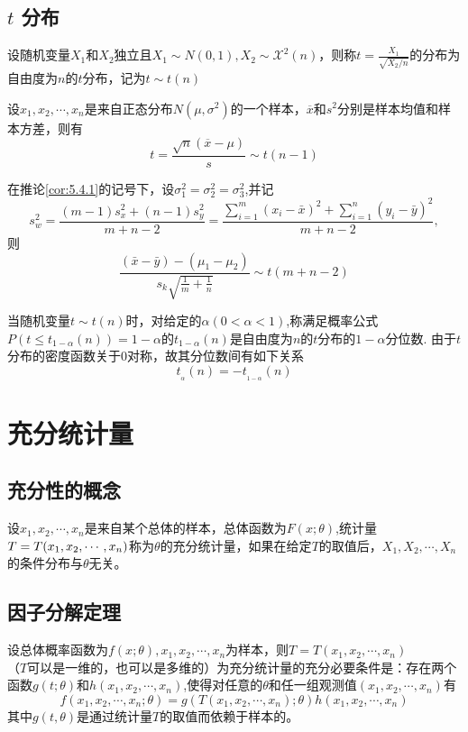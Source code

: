     \subsection{\texorpdfstring{$t$}{t} 分布}
    \begin{definition}
        设随机变量$X_1$和$X_2$独立且$X_1 \sim N(0,1),X_2 \sim \mathcal{X}^2(n)$，则称$t=\frac{X_1}{\sqrt{X_2/n}}$的分布为自由度为$n$的$t$分布，记为$t \sim t(n)$
    \end{definition}
    \begin{corollary}[正态总体的抽样分布]
        设$x_1,x_2,\cdots,x_n$是来自正态分布$N(\mu,\sigma^2)$的一个样本，$\overline{x}$和$s^2$分别是样本均值和样本方差，则有
        $$
            t = \frac{\sqrt{n}(\overline{x}-\mu)}{s} \sim t(n-1)
        $$
    \end{corollary}
    \begin{corollary}
        在推论\ref{cor:5.4.1}的记号下，设$\sigma_1^2=\sigma_2^2=\sigma_3^2$,并记
        $$s_{w}^{2}=\frac{(m-1) s_{x}^{2}+(n-1) s_{y}^{2}}{m+n-2}=\frac{\sum_{i=1}^{m}\left(x_{i}-\bar{x}\right)^{2}+\sum_{i=1}^{n}\left(y_{i}-\bar{y}\right)^{2}}{m+n-2} ,
        $$
        则
        $$\frac{(\bar{x}-\bar{y})-\left(\mu_{1}-\mu_{2}\right)}{s_{k} \sqrt{\frac{1}{m}+\frac{1}{n}}} \sim t(m+n-2)
        $$

    \end{corollary}
    当随机变量$t \sim t( n )$时，对给定的$\alpha(0<\alpha<1)$,称满足概率公式$P(t\leq t_{1-\alpha}(n))=1-\alpha$的$t_{1-\alpha}(n)$是自由度为$n$的$t$分布的$1-\alpha$分位数.
    由于$t$分布的密度函数关于$0$对称，故其分位数间有如下关系
$$
    t_{_\alpha}(n)=-t_{_{1-\alpha}}(n)
$$
\section{充分统计量}
\subsection{充分性的概念}
\begin{definition}
    设$x_1,x_2,\cdots,x_n$是来自某个总体的样本，总体函数为$F(x;\theta)$,统计量$T=T(x_1,\\x_2, \cdots, x_n)$称为$\theta$的充分统计量，如果在给定$T$的取值后，$X_1,X_2,\cdots,X_n$的条件分布与$\theta$无关。
\end{definition}
\subsection{因子分解定理}
\begin{theorem}
    设总体概率函数为$f(x;\theta),x_1,x_2,\cdots,x_n$为样本，则$T=T(x_1,x_2,\cdots,x_n)$\\（$T$可以是一维的，也可以是多维的）为充分统计量的充分必要条件是：存在两个函数$g(t;\theta)$和$h(x_1,x_2,\cdots,x_n)$,使得对任意的$\theta$和任一组观测值$(x_1,x_2,\cdots,x_n)$有
    $$
        f(x_1,x_2,\cdots,x_n;\theta)=g(T(x_1,x_2,\cdots,x_n);\theta)h(x_1,x_2,\cdots,x_n)
    $$
    其中$g(t,\theta)$是通过统计量$T$的取值而依赖于样本的。
\end{theorem}

